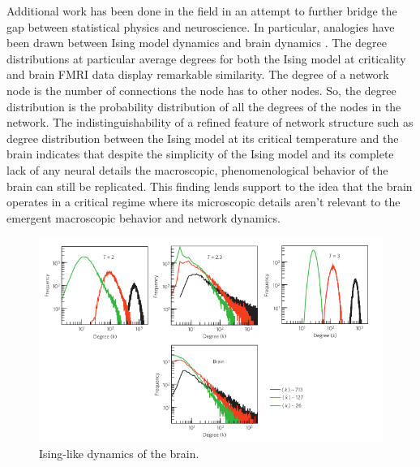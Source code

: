 \documentclass[12pt]{article}
\begin{document}
Additional work has been done in the field in an attempt to further bridge the gap between statistical physics and neuroscience. In particular, analogies have been drawn between Ising model dynamics and brain dynamics \cite{Fraiman2009a}. The degree distributions at particular average degrees for both the Ising model at criticality and brain FMRI data display remarkable similarity. The degree of a network node is the number of connections the node has to other nodes. So, the degree distribution is the probability distribution of all the degrees of the nodes in the network. The indistinguishability of a refined feature of network structure such as degree distribution between the Ising model at its critical temperature and the brain indicates that despite the simplicity of the Ising model and its complete lack of any neural details the macroscopic, phenomenological behavior of the brain can still be replicated. This finding lends support to the idea that the brain operates in a critical regime where its microscopic details aren't relevant to the emergent macroscopic behavior and network dynamics.

\begin{figure}      
  \begin{center}    
 \includegraphics[width=.8\textwidth]{isinglikedynamicschialvo}    
    \caption{Ising-like dynamics of the brain. \cite{Fraiman2009a}}   
   \label{Figure::Ising model and the brain at criticality}   
  \end{center}     
   \end{figure}
\end{document}
